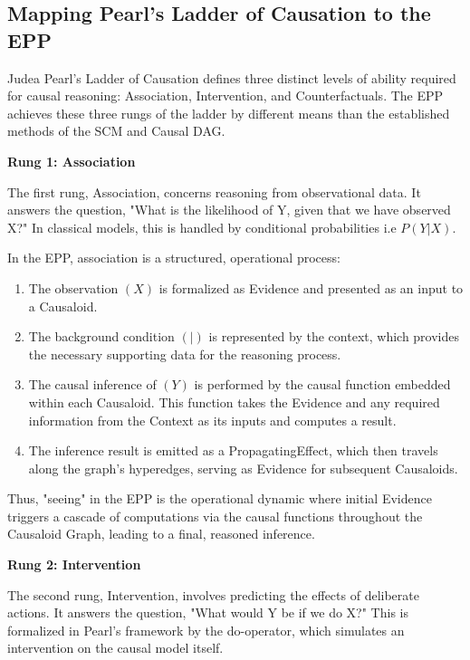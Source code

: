 %
%
\subsection{Mapping Pearl's Ladder of Causation to the EPP}
\label{sec:epp_ladder_causation}

Judea Pearl's Ladder of Causation\cite{pearl2000causality} defines three distinct levels of ability required for causal reasoning: Association, Intervention, and Counterfactuals. The EPP achieves these three rungs of the ladder by different means than the established methods of the SCM and Causal DAG.  

\textbf{Rung 1: Association}

The first rung, Association, concerns reasoning from observational data. 
It answers the question, "What is the likelihood of Y, given that we have observed X?" In classical models, this is handled by conditional probabilities i.e $P(Y|X)$.

In the EPP, association is a structured, operational process:

\begin{enumerate}
	\item The observation $(X)$ is formalized as Evidence and presented as an input to a Causaloid.
	\item The background condition $(|)$ is represented by the context, which provides the necessary supporting data for the reasoning process.
	\item The causal inference of $(Y)$ is performed by the causal function embedded within each Causaloid. This function takes the Evidence and any required information from the Context as its inputs and computes a result.
	\item The inference result is emitted as a PropagatingEffect, which then travels along the graph's hyperedges, serving as Evidence for subsequent Causaloids.
\end{enumerate}

Thus, "seeing" in the EPP is the operational dynamic where initial Evidence triggers a cascade of computations via the causal functions throughout the Causaloid Graph, leading to a final, reasoned inference.

\textbf{Rung 2: Intervention}

The second rung, Intervention, involves predicting the effects of deliberate actions. It answers the question, "What would Y be if we do X?" This is formalized in Pearl's framework by the do-operator, which simulates an intervention on the causal model itself.

